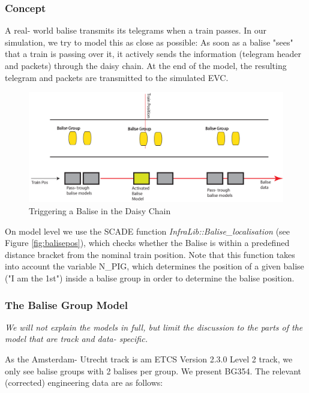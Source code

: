 \documentclass{template/openetcs_article}
\begin{document}
\subsubsection{Concept}

A real- world balise transmits its telegrams when a train passes. In our simulation, we try to model this as close as possible: As soon as a balise "sees" that a train is passing over it, it actively sends the information (telegram header and packets) through the daisy chain. At the end of the model, the resulting telegram and packets are transmitted to the simulated EVC. 
\begin{figure}[H]
  \centering
  \includegraphics[width=\textwidth]{images/BaliseChain}
  \caption{Triggering a Balise in the Daisy Chain}
  \label{fig:balisechain}
\end{figure}



On model level we use the SCADE function \emph{InfraLib::Balise\_localisation} (see Figure \ref{fig:balisepos}), which checks whether the Balise is within a predefined distance bracket from the nominal train position.\newline\newline 
Note that this function takes into account the variable N\_PIG, which determines the position of a given balise ("I am the 1st") inside a balise group in order to determine the balise position. 




\subsubsection{The Balise Group Model}

\emph{We will not explain the models in full, but limit the discussion to the parts of the model that are track and data- specific. }

As the Amsterdam- Utrecht track is am ETCS Version 2.3.0 Level 2 track, we only see balise groups with 2 balises per group.
We present BG354. The relevant (corrected) engineering data are as follows:
\end{document}
